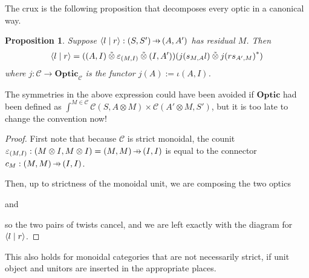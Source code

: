 \documentclass[11pt,letterpaper]{article}
\theoremstyle{plain}
\newtheorem{proposition}[theorem]{Proposition}
\theoremstyle{definition}
\newcommand{\C}{\mathscr{C}}
\newcommand{\Optic}{\mathbf{Optic}}
\newcommand{\switched}{\mathbin{\tilde{\otimes}}}
\newcommand{\rep}[2]{{\ensuremath \left\langle #1 \mid #2 \right\rangle}}
\newcommand{\hto}{\ensuremath{\,\mathaccent\shortmid\rightarrow\,}}
\begin{document}
The crux is the following proposition that decomposes every optic in a canonical way.

\begin{proposition}\label{prop:optic-decompose}
  Suppose $\rep{l}{r} : (S, S') \hto (A, A')$ has residual $M$. Then
  \begin{align*}
    \rep{l}{r} = ((A, I) \switched \varepsilon_{(M, I)} \switched (I, A'))(j(s_{M,A}l) \switched j{(rs_{A',M})}^*)
  \end{align*}
  where $j : \C \to \Optic_\C$ is the functor $j(A) := \iota(A, I)$.
\end{proposition}
The symmetries in the above expression could have been avoided if $\Optic$ had been defined as $\int^{M \in \C} \C(S, A \otimes M) \times \C(A' \otimes M, S')$, but it is too late to change the convention now!
\begin{proof}
  First note that because $\C$ is strict monoidal, the counit $\varepsilon_{(M, I)} : (M \otimes I, M \otimes I) = (M, M) \hto (I, I)$ is equal to the connector $c_M : (M, M) \hto (I, I)$.

  Then, up to strictness of the monoidal unit, we are composing the two optics
  \begin{center}
    
  \end{center}
  and
  \begin{center}
    
  \end{center}
  so the two pairs of twists cancel, and we are left exactly with the diagram for $\rep{l}{r}$.
\end{proof}

This also holds for monoidal categories that are not necessarily strict, if unit object and unitors are inserted in the appropriate places.
\end{document}
